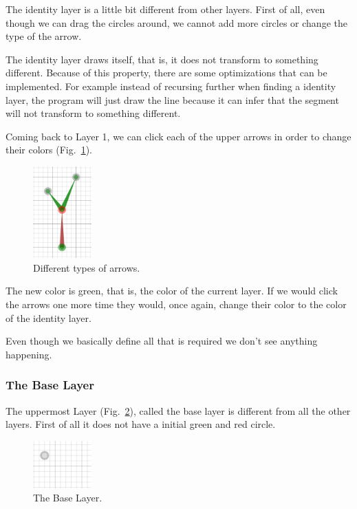             The identity layer is a little bit different from other layers.
            First of all, even though we can drag the circles around, we cannot add more circles or change the type of the arrow.

            \FloatBarrier

            The identity layer draws itself, that is, it does not transform to something different.
            Because of this property, there are some optimizations that can be implemented.
            For example instead of recursing further when finding a identity layer, the program will just draw the line because it can infer that 
            the segment will not transform to something different.

            Coming back to Layer 1, we can click each of the upper arrows in order to change their colors (Fig.~\ref{gui04}).

            \begin{figure}[ht]
                \caption{\label{gui04} Different types of arrows.}
                \centering
                \includegraphics[width=0.2\textwidth]{img/gui04.png}
            \end{figure}
            \FloatBarrier

            The new color is green, that is, the color of the current layer.
            If we would click the arrows one more time they would, once again, change their color to the color of the identity layer.

            Even though we basically define all that is required we don't see anything happening.

        \subsubsection{The Base Layer}

            The uppermost Layer (Fig.~\ref{baselayer01}), called the base layer is different from all the other layers.
            First of all it does not have a initial green and red circle. 

            \begin{figure}[ht]
                \caption{\label{baselayer01} The Base Layer.}
                \centering
                \includegraphics[width=0.2\textwidth]{img/baselayer01.png}
            \end{figure}

